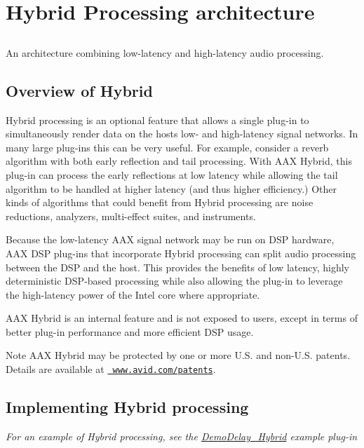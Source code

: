 \hypertarget{a00805}{}\section{Hybrid Processing architecture}
\label{a00805}


\subsection{ }
An architecture combining low-\/latency and high-\/latency audio processing. 

 \hypertarget{a00805_additionalFeatures_Hybrid_overview}{}\subsection{Overview of Hybrid}\label{a00805_additionalFeatures_Hybrid_overview}
Hybrid processing is an optional feature that allows a single plug-\/in to simultaneously render data on the host\textquotesingle{}s low-\/ and high-\/latency signal networks. In many large plug-\/ins this can be very useful. For example, consider a reverb algorithm with both early reflection and tail processing. With A\+AX Hybrid, this plug-\/in can process the early reflections at low latency while allowing the tail algorithm to be handled at higher latency (and thus higher efficiency.) Other kinds of algorithms that could benefit from Hybrid processing are noise reductions, analyzers, multi-\/effect suites, and instruments.

Because the low-\/latency A\+AX signal network may be run on D\+SP hardware, A\+AX D\+SP plug-\/ins that incorporate Hybrid processing can split audio processing between the D\+SP and the host. This provides the benefits of low latency, highly deterministic D\+S\+P-\/based processing while also allowing the plug-\/in to leverage the high-\/latency power of the Intel core where appropriate.

A\+AX Hybrid is an internal feature and is not exposed to users, except in terms of better plug-\/in performance and more efficient D\+SP usage.

\begin{DoxyNote}{Note}
A\+AX Hybrid may be protected by one or more U.\+S. and non-\/\+U.\+S. patents. Details are available at \href{https://www.avid.com/patents}{\texttt{ www.\+avid.\+com/patents}}.
\end{DoxyNote}
\hypertarget{a00805_additionalFeatures_Hybrid_adding}{}\subsection{Implementing Hybrid processing}\label{a00805_additionalFeatures_Hybrid_adding}
{\itshape For an example of Hybrid processing, see the \mbox{\hyperlink{a00848_DemoDelay_Hybrid}{Demo\+Delay\+\_\+\+Hybrid}} example plug-\/in}

